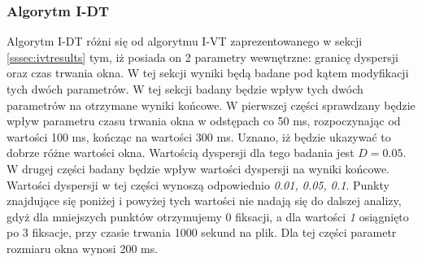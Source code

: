 \subsubsection{Algorytm I-DT}
\label{sssec:idtresults}
Algorytm I-DT różni się od algorytmu I-VT zaprezentowanego w sekcji \ref{sssec:ivtresults} tym, iż posiada on 2 parametry wewnętrzne: granicę dyspersji oraz czas trwania okna. W tej sekcji wyniki będą badane pod kątem modyfikacji tych dwóch parametrów. W tej sekcji badany będzie wpływ tych dwóch parametrów na otrzymane wyniki końcowe. W pierwszej części sprawdzany będzie wpływ parametru czasu trwania okna w odstępach co 50 ms, rozpoczynając od wartości 100 ms, kończąc na wartości 300 ms. Uznano, iż będzie ukazywać to dobrze różne wartości okna. Wartością dyspersji dla tego badania jest $D = 0.05$. W drugej części badany będzie wpływ wartości dyspersji na wyniki końcowe. Wartości dyspersji w tej części wynoszą odpowiednio \emph{0.01, 0.05, 0.1}. Punkty znajdujące się poniżej i powyżej tych wartości nie nadają się do dalszej analizy, gdyż dla mniejszych punktów otrzymujemy 0 fiksacji, a dla wartości \emph{1} osiągnięto po 3 fiksacje, przy czasie trwania 1000 sekund na plik. Dla tej części parametr rozmiaru okna wynosi 200 ms.\par

